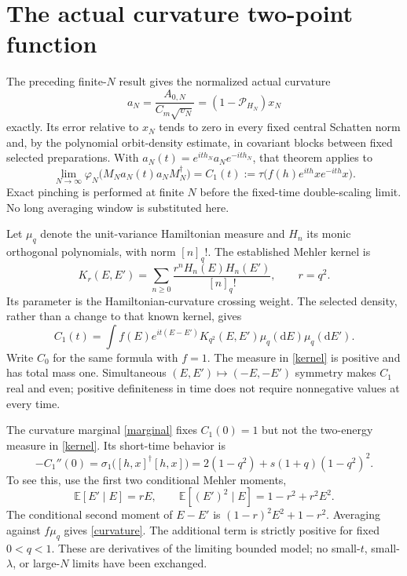 \documentclass[11pt]{article}
\newcommand{\E}{\mathbb E}
\newcommand{\dd}{\mathrm d}
\begin{document}
\newpage
\section{The actual curvature two-point function}
The preceding finite-$N$ result gives the normalized actual curvature
\begin{equation}
 a_N=\frac{A_{0,N}}{C_m\sqrt{v_N}}
       =(1-\mathcal P_{H_N})x_N
\end{equation}
exactly. Its error relative to $x_N$ tends to zero in every fixed
central Schatten norm and, by the polynomial orbit-density estimate,
in covariant blocks between fixed selected preparations. With
$a_N(t)=e^{ith_N}a_Ne^{-ith_N}$, that theorem applies to
\begin{equation}\label{physical}
 \lim_{N\to\infty}\varphi_N\bigl(M_Na_N(t)a_NM_N^\dagger\bigr)
 =C_1(t):=\tau\bigl(f(h)e^{ith}xe^{-ith}x\bigr).
\end{equation}
Exact pinching is performed at finite $N$ before the fixed-time
double-scaling limit. No long averaging window is substituted here.

Let $\mu_q$ denote the unit-variance Hamiltonian measure and $H_n$ its
monic orthogonal polynomials, with norm $[n]_q!$. The established
Mehler kernel \cite[Sec.~3.2]{BINT} is
\begin{equation}
 K_r(E,E')=\sum_{n\ge0}\frac{r^nH_n(E)H_n(E')}{[n]_q!},
 \qquad r=q^2.
\end{equation}
Its parameter is the Hamiltonian-curvature crossing weight. The
selected density, rather than a change to that known kernel, gives
\begin{equation}\boxed{
 C_1(t)=\int f(E)e^{it(E-E')}K_{q^2}(E,E')
                  \mu_q(\dd E)\mu_q(\dd E').}\label{kernel}
\end{equation}
Write $C_0$ for the same formula with $f=1$. The measure in
\eqref{kernel} is positive and has total mass one. Simultaneous
$(E,E')\mapsto(-E,-E')$ symmetry makes $C_1$ real and even; positive
definiteness in time does not require nonnegative values at every time.

The curvature marginal \eqref{marginal} fixes $C_1(0)=1$ but not the
two-energy measure in \eqref{kernel}. Its short-time behavior is
\begin{equation}\boxed{
 -C_1''(0)=\sigma_1\bigl([h,x]^\dagger[h,x]\bigr)
 =2(1-q^2)+s(1+q)(1-q^2)^2.}\label{curvature}
\end{equation}
To see this, use the first two conditional Mehler moments,
\begin{equation}
 \E[E'\mid E]=rE,\qquad
 \E[(E')^2\mid E]=1-r^2+r^2E^2.
\end{equation}
The conditional second moment of $E-E'$ is
$(1-r)^2E^2+1-r^2$. Averaging against $f\mu_q$ gives
\eqref{curvature}. The additional term is strictly positive for
fixed $0<q<1$. These are derivatives of the limiting bounded model;
no small-$t$, small-$\lambda$, or large-$N$ limits have been exchanged.
\end{document}
